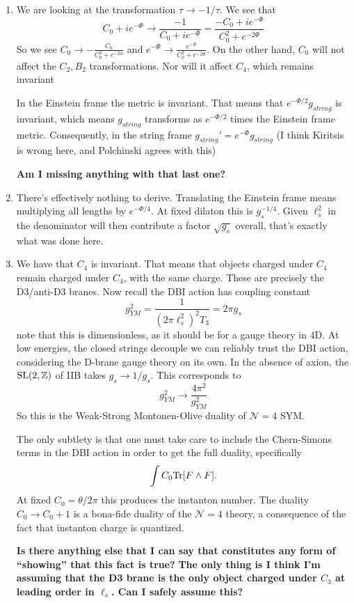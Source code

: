 \documentclass[11pt, class=article, crop=false]{standalone}
\begin{document}
\begin{enumerate}
	\item We are looking at the transformation $\tau \to -1/\tau$. We see that 
	\[
		C_0 + i e^{- \Phi} \to \frac{-1}{C_0 + i e^{- \Phi}} = \frac{-C_0 + i e^{- \Phi}}{C_0^2 + e^{-2\Phi}}
	\]
	So we see $C_0 \to - \frac{C_0}{C_0^2 + e^{-2\phi}}$ and $e^{-\Phi} \to \frac{e^{-\Phi}}{C_0^2 + e^{-2\Phi}}$. On the other hand, $C_0$ will not affect the $C_2, B_2$ transformations. Nor will it affect $C_4$, which remains invariant
	
	In the Einstein frame the metric is invariant. That means that $e^{-\Phi/2} g_{string}$ is invariant, which means $g_{string}$ transforms as $e^{-\Phi/2}$ times the Einstein frame metric. Consequently, in the string frame $g_{string}' = e^{-\Phi} g_{string}$ (I think Kiritsis is wrong here, and Polchinski agrees with this)

	\textbf{Am I missing anything with that last one?}
	
	\item There's effectively nothing to derive. Translating the Einstein frame means multiplying all lengths by $e^{-\Phi/4}$. At fixed dilaton this is $g_s^{-1/4}$. Given $\ell_s^2$ in the denominator will then contribute a factor $\sqrt{g_s}$ overall, that's exactly what was done here.  
	
	\item We have that $C_4$ is invariant. That means that objects charged under $C_4$ remain charged under $C_4$, with the same charge. These are precisely the D3/anti-D3 branes. Now recall the DBI action has coupling constant
	\[
		g_{YM}^2 = \frac{1}{(2\pi \ell_s^2)^2 T_3} = 2 \pi g_s
	\]
	note that this is dimensionless, as it should be for a gauge theory in 4D. At low energies, the closed strings decouple we can reliably trust the DBI action, considering the D-brane gauge theory on its own. In the absence of axion, the $\mathrm{SL}(2, \mathbb{Z})$ of IIB takes $g_s \to 1/g_s$. This corresponds to
	\[
		g^2_{YM} \to \frac{4\pi^2}{g_{YM}^2}
	\]
	So this is the Weak-Strong Montonen-Olive duality of $\mathcal N=4$ SYM.
	
	The only subtlety is that one must take care to include the Chern-Simons terms in the DBI action in order to get the full duality, specifically 
	\[
		\int C_0 \mathrm{Tr} [F \wedge F].
	\]
	At fixed $C_0 = \theta/2\pi$ this produces the instanton number. The duality $C_0 \to C_0 + 1$ is a bona-fide duality of the $\mathcal N=4$ theory, a consequence of the fact that instanton charge is quantized. 
	
	\textbf{Is there anything else that I can say that constitutes any form of ``showing'' that this fact is true?}
	\textbf{The only thing is I think I'm assuming that the D3 brane is the only object charged under $C_3$ at leading order in $\ell_s$. Can I safely assume this?}
	

\end{enumerate}
\end{document}
